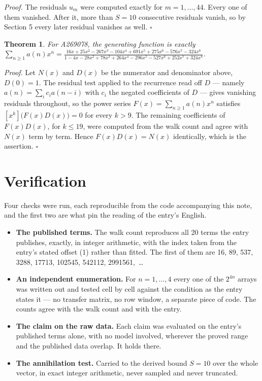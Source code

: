 \documentclass[11pt]{article}
\newtheorem{theorem}{Theorem}
\theoremstyle{definition}
\begin{document}
{\itshape Proof.} The residuals $u_m$ were computed exactly for $m = 1,\dots,44$. Every one of them vanished. After it, more than $S = 10$ consecutive residuals vanish, so by Section 5 every later residual vanishes as well. $\square$

\begin{theorem} For A269078, the generating function is exactly $\sum_{n\ge 1} a(n)x^n = \frac{16x + 25x^{2} - 267x^{3} - 104x^{4} + 691x^{5} + 275x^{6} - 576x^{7} - 324x^{8}}{1 - 4x - 28x^{2} + 78x^{3} + 264x^{4} - 296x^{5} - 527x^{6} + 252x^{7} + 324x^{8}}$.\end{theorem}

{\itshape Proof.} Let $N(x)$ and $D(x)$ be the numerator and denominator above, $D(0)=1$. The residual test applied to the recurrence read off $D$ --- namely $a(n) = \sum_i c_i a(n-i)$ with $c_i$ the negated coefficients of $D$ --- gives vanishing residuals throughout, so the power series $F(x)=\sum_{n\ge 1}a(n)x^n$ satisfies $[x^k]\bigl(F(x)D(x)\bigr) = 0$ for every $k > 9$. The remaining coefficients of $F(x)D(x)$, for $k \le 19$, were computed from the walk count and agree with $N(x)$ term by term. Hence $F(x)D(x) = N(x)$ identically, which is the assertion. $\square$

\section{Verification}

Four checks were run, each reproducible from the code accompanying this note, and the first two are what pin the reading of the entry's English.

\begin{itemize}

\item {\bfseries The published terms.} The walk count reproduces all 20 terms the entry publishes, exactly, in integer arithmetic, with the index taken from the entry's stated offset (1) rather than fitted. The first of them are 16, 89, 537, 3288, 17713, 102545, 542112, 2991561,~\dots

\item {\bfseries An independent enumeration.} For $n = 1,\dots,4$ every one of the $2^{4n}$ arrays was written out and tested cell by cell against the condition as the entry states it --- no transfer matrix, no row window, a separate piece of code. The counts agree with the walk count and with the entry.

\item {\bfseries The claim on the raw data.} Each claim was evaluated on the entry's published terms alone, with no model involved, wherever the proved range and the published data overlap. It holds there.

\item {\bfseries The annihilation test.} Carried to the derived bound $S = 10$ over the whole vector, in exact integer arithmetic, never sampled and never truncated.

\end{itemize}
\end{document}
